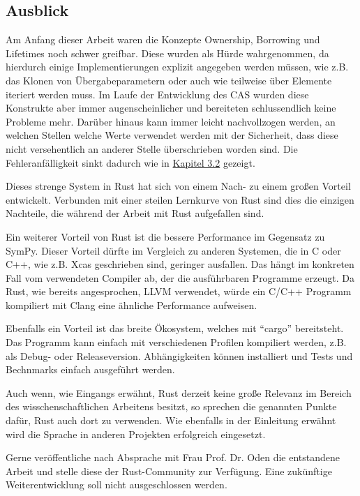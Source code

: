 \documentclass[11pt,a4paper, ngerman]{article}
\begin{document}
\subsection{Ausblick}
Am Anfang dieser Arbeit waren die Konzepte Ownership, Borrowing und Lifetimes noch schwer greifbar. Diese wurden als Hürde wahrgenommen, da hierdurch einige Implementierungen  explizit angegeben werden müssen, wie z.B. das Klonen von Übergabeparametern oder auch wie teilweise über Elemente iteriert werden muss. Im Laufe der Entwicklung des CAS wurden diese Konstrukte aber immer augenscheinlicher und bereiteten schlussendlich keine Probleme mehr. Darüber hinaus kann immer leicht nachvollzogen werden, an welchen Stellen welche Werte verwendet werden mit der Sicherheit, dass diese nicht versehentlich an anderer Stelle überschrieben worden sind. Die Fehleranfälligkeit sinkt dadurch wie in \hyperref[sec:kap3d2]{Kapitel 3.2} gezeigt.

Dieses strenge System in Rust hat sich von einem Nach- zu einem großen Vorteil entwickelt. Verbunden mit einer steilen Lernkurve von Rust sind dies die einzigen Nachteile, die während der Arbeit mit Rust aufgefallen sind.

Ein weiterer Vorteil von Rust ist die bessere Performance im Gegensatz zu SymPy. Dieser Vorteil dürfte im Vergleich zu anderen Systemen, die in C oder C++, wie z.B. Xcas \cite{XcasLink} geschrieben sind, geringer ausfallen. Das hängt im konkreten Fall vom verwendeten Compiler ab, der die ausführbaren Programme erzeugt. Da Rust, wie bereits angesprochen, LLVM verwendet, würde ein C/C++ Programm kompiliert mit Clang eine ähnliche Performance aufweisen.

Ebenfalls ein Vorteil ist das breite Ökosystem, welches mit ``cargo'' bereitsteht. Das Programm kann einfach mit verschiedenen Profilen kompiliert werden, z.B. als Debug- oder Releaseversion. Abhängigkeiten können installiert und Tests und Bechnmarks einfach ausgeführt werden.

Auch wenn, wie Eingangs erwähnt, Rust derzeit keine große Relevanz im Bereich des wisschenschaftlichen Arbeitens besitzt, so sprechen die genannten Punkte dafür, Rust auch dort zu verwenden. Wie ebenfalls in der Einleitung erwähnt wird die Sprache in anderen Projekten erfolgreich eingesetzt.

Gerne veröffentliche nach Absprache mit Frau Prof. Dr. Oden die entstandene Arbeit und stelle diese der Rust-Community zur Verfügung. Eine zukünftige Weiterentwicklung soll nicht ausgeschlossen werden.

\newpage

\raggedright

\end{document}
